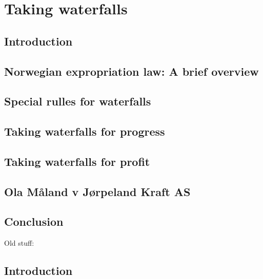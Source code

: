 \chapter{Taking waterfalls}\label{chap:4}

\section{Introduction}\label{sec:intro4}

\section{Norwegian expropriation law: A brief overview}

\section{Special rulles for waterfalls}

\section{Taking waterfalls for progress}

\section{Taking waterfalls for profit}

\section{Ola Måland v Jørpeland Kraft AS}

\section{Conclusion}

Old stuff:

\section{Introduction}\label{intro}

